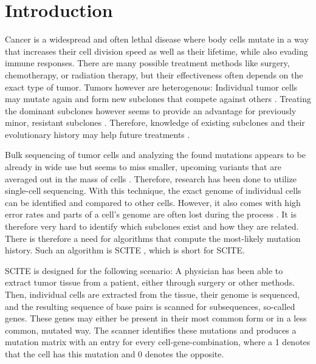 \chapter{Introduction}
\label{ch:introduction}

Cancer is a widespread and often lethal disease\cite{10.1001/jamaoncol.2021.6987} where body cells mutate in a way that increases their cell division speed as well as their lifetime, while also evading immune responses. There are many possible treatment methods like surgery, chemotherapy, or radiation therapy, but their effectiveness often depends on the exact type of tumor. Tumors however are heterogenous: Individual tumor cells may mutate again and form new subclones that compete against others \cite{nik2012life}. Treating the dominant subclones however seems to provide an advantage for previously minor, resistant subclones \cite{gillies2012evolutionary}. Therefore, knowledge of existing subclones and their evolutionary history may help future treatments \cite{greaves2012clonal, stratton2009cancer, swanton2012intratumor}.

Bulk sequencing of tumor cells and analyzing the found mutations appears to be already in wide use but seems to miss smaller, upcoming variants that are averaged out in the mass of cells \cite{navin2014cancer}. Therefore, research has been done to utilize single-cell sequencing. With this technique, the exact genome of individual cells can be identified and compared to other cells. However, it also comes with high error rates and parts of a cell's genome are often lost during the process \cite{tree2016}. It is therefore very hard to identify which subclones exist and how they are related. There is therefore a need for algorithms that compute the most-likely mutation history. Such an algorithm is \acs{SCITE} \cite{tree2016}, which is short for \acl{SCITE}.

\ac{SCITE} is designed for the following scenario: A physician has been able to extract tumor tissue from a patient, either through surgery or other methods. Then, individual cells are extracted from the tissue, their genome is sequenced, and the resulting sequence of base pairs is scanned for subsequences, so-called genes. These genes may either be present in their most common form or in a less common, mutated way. The scanner identifies these mutations and produces a mutation matrix with an entry for every cell-gene-combination, where a 1 denotes that the cell has this mutation and 0 denotes the opposite.

